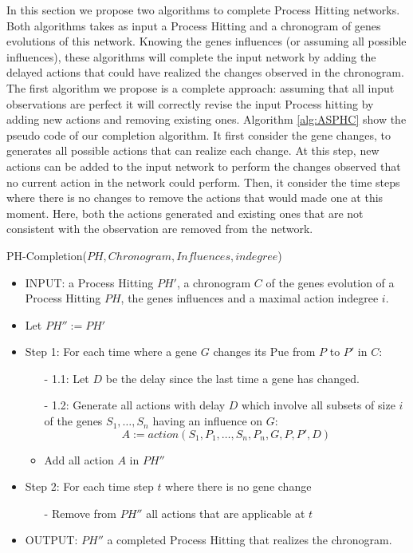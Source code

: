 In this section we propose two algorithms to complete Process Hitting networks.
Both algorithms takes as input a Process Hitting and a chronogram of genes evolutions of this network.
Knowing the genes influences (or assuming all possible influences),
these algorithms will complete the input network by adding the delayed actions that could have realized the changes observed in the chronogram.
The first algorithm we propose is a complete approach:
assuming that all input observations are perfect it will correctly revise the input Process hitting by adding new actions and removing existing ones.
Algorithm \ref{alg:ASPHC} show the pseudo code of our completion algorithm.
It first consider the gene changes, to generates all possible actions that can realize each change.
At this step, new actions can be added to the input network to perform the changes observed that no current action in the network could perform.
Then, it consider the time steps where there is no changes to remove the actions that would made one at this moment.
Here, both the actions generated and existing ones that are not consistent with the observation are removed from the network.

\begin{algorithm}
	\caption{PH-Completion($PH,Chronogram,Influences,indegree$)}
	\label{alg:PHC}
	\begin{itemize}
		\item INPUT: a Process Hitting $PH'$, a chronogram $C$ of the genes evolution of a Process Hitting $PH$, the genes influences and a maximal action indegree $i$.

		\item Let $PH'' := PH'$
		\item Step 1: For each time where a gene $G$ changes its Pue from $P$ to $P'$ in $C$:

		\begin{itemize}
			\item[-] 1.1: Let $D$ be the delay since the last time a gene has changed.
			\item[-] 1.2: Generate all actions with delay $D$ which involve all subsets of size $i$ of the genes $S_1, \ldots, S_n$ having an influence on $G$:
			$$A := action(S_1,P_1,\ldots, S_n,P_n, G, P, P', D)$$
			\item Add all action $A$ in $PH''$
		\end{itemize}

		\item Step 2: For each time step $t$ where there is no gene change
		\begin{itemize}
			\item[-] Remove from $PH''$ all actions that are applicable at $t$
		\end{itemize}
		\item OUTPUT: $PH''$ a completed Process Hitting that realizes the chronogram.
	\end{itemize}
\end{algorithm}

